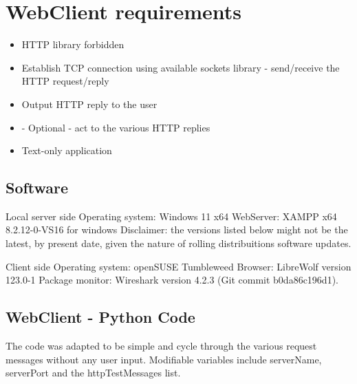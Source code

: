 \documentclass[11pt,a4paper]{report}
\begin{document}
    \section{WebClient requirements}
        \begin{itemize}
            \item HTTP library forbidden
            \item Establish TCP connection using available sockets library - send/receive the HTTP request/reply
            \item Output HTTP reply to the user
            \item - Optional - act to the various HTTP replies
            \item Text-only application
        \end{itemize}

    \subsection{Software}
        \item Local server side
            \subitem Operating system: Windows 11 x64
            \subitem WebServer: XAMPP x64 8.2.12-0-VS16 for windows
        Disclaimer: the versions listed below might not be the latest, by present date, given the nature of rolling distribuitions software updates.
        \item Client side
            \subitem Operating system: openSUSE Tumbleweed
            \subitem Browser: LibreWolf version 123.0-1
            \subitem Package monitor: Wireshark version 4.2.3 (Git commit b0da86c196d1).
    
    \subsection{WebClient - Python Code}
        \lstset{style=pythoncode}
        
        The code was adapted to be simple and cycle through the various request messages without any user input.
        Modifiable variables include serverName, serverPort and the httpTestMessages list.
    
\end{document}
